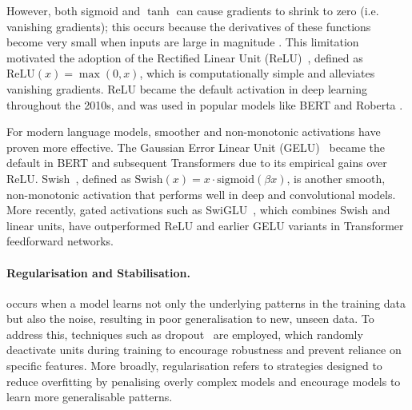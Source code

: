 However, both sigmoid and $\tanh$ can cause gradients to shrink to zero (i.e. vanishing gradients); this occurs because the derivatives of these functions become very small when inputs are large in magnitude \citep{glorot2010understanding}. This limitation motivated the adoption of the Rectified Linear Unit (ReLU)~\citep{nair2010rectified}, defined as $\mathrm{ReLU}(x) = \max(0, x)$, which is computationally simple and alleviates vanishing gradients. ReLU became the default activation in deep learning throughout the 2010s, and was used in popular models like BERT \citep{devlin2019bert} and Roberta \citep{liu2019roberta}. %

For modern language models, smoother and non-monotonic activations have proven more effective. The Gaussian Error Linear Unit (GELU)~\citep{hendrycks2016gaussian} became the default in BERT and subsequent Transformers due to its empirical gains over ReLU. Swish~\citep{ramachandran2017searching}, defined as $\mathrm{Swish}(x) = x \cdot \mathrm{sigmoid}(\beta x)$, is another smooth, non-monotonic activation that performs well in deep and convolutional models. More recently, gated activations such as SwiGLU~\citep{shazeer2020glu}, which combines Swish and linear units, have outperformed ReLU and earlier GELU variants in Transformer feedforward networks.

\paragraph{Regularisation and Stabilisation.}  occurs when a model learns not only the underlying patterns in the training data but also the noise, resulting in poor generalisation to new, unseen data. To address this,  techniques such as dropout~\citep{srivastava2014dropout} are employed, which randomly deactivate units during training to encourage robustness and prevent reliance on specific features. More broadly, regularisation refers to strategies designed to reduce overfitting by penalising overly complex models and encourage models to learn more generalisable patterns.

